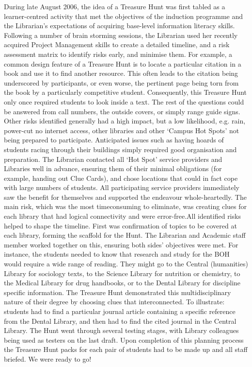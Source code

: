 During late August 2006, the idea of a Treasure Hunt was first tabled as a learner-centred 
activity that met the objectives of the induction programme and the Librarian’s 
expectations of acquiring base-level information literacy skills. Following a number of brain 
storming sessions, the Librarian used her recently acquired Project Management skills to 
create a detailed timeline, and a risk assessment matrix to identify risks early, and 
minimise them. For example, a common design feature of a Treasure Hunt is to locate a 
particular citation in a book and use it to find another resource. This often leads to the 
citation being underscored by participants, or even worse, the pertinent page being torn 
from the book by a particularly competitive student. Consequently, this Treasure Hunt only 
once required students to look inside a text. The rest of the questions could be answered 
from call numbers, the outside covers, or simply range guide signs. Other risks identified 
generally had a high impact, but a low likelihood, e.g. rain, power-cut no internet access, 
other libraries and other ‘Campus Hot Spots’ not being prepared to participate. Anticipated 
issues such as having hoards of students racing through their buildings simply required 
good organisation and preparation. The Librarian contacted all ‘Hot Spot’ service providers 
and Libraries well in advance, ensuring them of their minimal obligations (for example, 
handing out Clue Cards), and chose locations that could in fact cope with large numbers of 
students. All participating service providers immediately saw the benefit for themselves 
and supported the endeavour whole-heartedly. The main risk, which was the most timeconsuming to eliminate, was creating clues for each library that had logical connectivity 
and were error-free.All identified risks helped to shape the timeline. First was confirmation of topics to be 
covered at each library, forming the scaffold for the Hunt. The Librarian and Academic 
staff member worked together on this, ensuring both sides’ objectives were met. For 
instance, the students needed to know that research and study for the BOH would require 
a wide range of reading. They might go to the Central (humanities) Library for sociology 
texts, to the Science Library for nutrition or chemistry, to the Medical Library for drug 
handbooks, or to the Dental Library for discipline specific information. The Treasure Hunt 
demonstrated this multidisciplinary nature of their degree by choosing clues that interconnected. To illustrate: students had to find a particular journal article containing a 
specific reference from the Dental Library, and then had to find the cited journal in the 
Central Library. 
The Hunt went through several testing stages, with Library colleagues being used as 
testers on the last draft. Upon completion of this planning process the Treasure Hunt 
packs for each pair of students had to be made up and all staff briefed. We were ready to 
go! 

